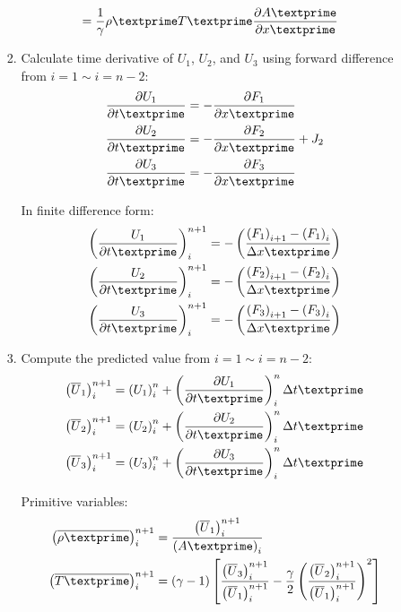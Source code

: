 \documentclass[12pt]{article}
\begin{document}
\begin{enumerate}
\begin{enumerate}
\begin{enumerate}
\begin{align}
						&= \frac{1}{\gamma}\rho\textprime T\textprime\frac{\partial A\textprime}{\partial x\textprime}
				\end{align}
			\item Calculate time derivative of $U_1$, $U_2$, and $U_3$ using forward difference from $i = 1 \sim i = n - 2$:
				\begin{align}
					\frac{\partial U_1}{\partial t\textprime} &= - \frac{\partial F_1}{\partial x\textprime}\\
					\frac{\partial U_2}{\partial t\textprime} &= - \frac{\partial F_2}{\partial x\textprime} + J_2 \\
					\frac{\partial U_3}{\partial t\textprime} &= - \frac{\partial F_3}{\partial x\textprime}
				\end{align}
				\par In finite difference form:
				\begin{align}
					\left(\frac{U_1}{\partial t\textprime}\right)_{i}^{n+1} &= -\left(\frac{\left(F_{1}\right)_{i+1} - \left(F_{1}\right)_{i}}{\Delta x\textprime}\right) \\
					\left(\frac{U_2}{\partial t\textprime}\right)_{i}^{n+1} &= -\left(\frac{\left(F_{2}\right)_{i+1} - \left(F_{2}\right)_{i}}{\Delta x\textprime}\right) \\
					\left(\frac{U_3}{\partial t\textprime}\right)_{i}^{n+1} &= -\left(\frac{\left(F_{3}\right)_{i+1} - \left(F_{3}\right)_{i}}{\Delta x\textprime}\right)
				\end{align}

			\item Compute the predicted value from $i = 1 \sim i = n - 2$:
				\begin{align}
					\left(\overline{U}_{1}\right)_{i}^{n+1} &= \left(U_{1}\right)_{i}^{n} + \left(\frac{\partial U_{1}}{\partial t\textprime}\right)_{i}^{n}\Delta t\textprime \\
					\left(\overline{U}_{2}\right)_{i}^{n+1} &= \left(U_{2}\right)_{i}^{n} + \left(\frac{\partial U_{2}}{\partial t\textprime}\right)_{i}^{n}\Delta t\textprime \\
					\left(\overline{U}_{3}\right)_{i}^{n+1} &= \left(U_{3}\right)_{i}^{n} + \left(\frac{\partial U_{3}}{\partial t\textprime}\right)_{i}^{n}\Delta t\textprime 
				\end{align}
				\par Primitive variables:
				\begin{align}
					\left(\overline{\rho\textprime}\right)_{i}^{n+1} &= \frac{\left(\overline{U}_{1}\right)_{i}^{n+1}}{\left(A\textprime\right)_{i}} \\
					\left(\overline{T\textprime}\right)_{i}^{n+1} &= \left(\gamma - 1\right)\left[\frac{\left(\overline{U}_3\right)_{i}^{n+1}}{\left(\overline{U}_1\right)_{i}^{n+1}} - \frac{\gamma}{2}\left(\frac{\left(\overline{U}_2\right)_{i}^{n+1}}{\left(\overline{U}_1\right)_{i}^{n+1}}\right)^2\right]
				\end{align}


\end{enumerate}
\end{enumerate}
\end{enumerate}
\end{document}
